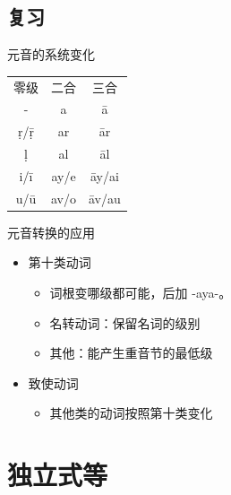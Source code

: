 \documentclass[17pt]{beamer}
\newcommand{\fullpada}[1]{\textcolor{OliveGreen}{#1}}
\begin{document}
\subsection{复习}

\begin{frame}{元音的系统变化}
  \centering
    \begin{tabular}{@{}ccc@{}} %
      零级 & 二合 & 三合  \\
      \fullpada{-} & \fullpada{a} & \fullpada{ā} \\
      \hline
      \fullpada{ṛ/ṝ}  & \fullpada{ar} & \fullpada{ār}   \\
      \fullpada{ḷ}  & \fullpada{al} & \fullpada{āl}   \\
      \hline
      \fullpada{i/ī} & \fullpada{ay/e} & \fullpada{āy/ai} \\
      \fullpada{u/ū} & \fullpada{av/o} & \fullpada{āv/au} \\
    \end{tabular}
\end{frame}

\begin{frame}{元音转换的应用}
  \begin{itemize}
    \item 第十类动词
    \begin{itemize}
      \item
        词根变哪级都可能，后加 \nobreakdash-aya\nobreakdash-。
      \item 名转动词：保留名词的级别
      \item 其他：能产生重音节的最低级
    \end{itemize}
    \item 致使动词
    \begin{itemize}
      \item
        其他类的动词按照第十类变化
    \end{itemize}
  \end{itemize}
\end{frame}

\section{独立式等}
\begin{frame}{\insertsection }
  \small
  \tableofcontents[currentsection]
\end{frame}
\end{document}
